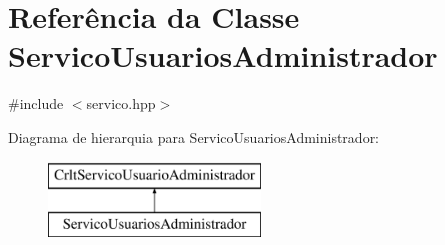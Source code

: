 \hypertarget{class_servico_usuarios_administrador}{}\section{Referência da Classe Servico\+Usuarios\+Administrador}
\label{class_servico_usuarios_administrador}


{\ttfamily \#include $<$servico.\+hpp$>$}

Diagrama de hierarquia para Servico\+Usuarios\+Administrador\+:\begin{figure}[H]
\begin{center}
\leavevmode
\includegraphics[height=2.000000cm]{class_servico_usuarios_administrador}
\end{center}
\end{figure}
